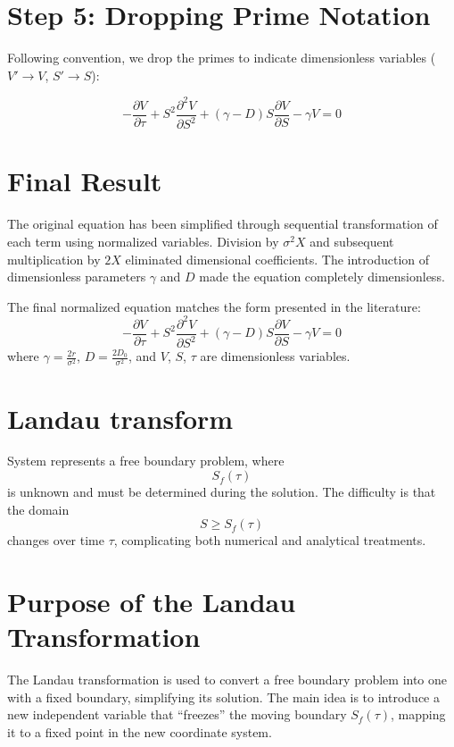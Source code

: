 \documentclass{article}
\begin{document}
\section*{Step 5: Dropping Prime Notation}
Following convention, we drop the primes to indicate dimensionless variables ($V' \to V$, $S' \to S$):

\begin{equation}
-\frac{\partial V}{\partial \tau} + S^2 \frac{\partial^2 V}{\partial S^2} + (\gamma - D) S \frac{\partial V}{\partial S} - \gamma V = 0
\end{equation}

\section*{Final Result}
The original equation has been simplified through sequential transformation of each term using normalized variables. Division by $\sigma^2 X$ and subsequent multiplication by $2X$ eliminated dimensional coefficients. The introduction of dimensionless parameters $\gamma$ and $D$ made the equation completely dimensionless.

The final normalized equation matches the form presented in the literature:
\begin{equation}
-\frac{\partial V}{\partial \tau} + S^2 \frac{\partial^2 V}{\partial S^2} + (\gamma - D) S \frac{\partial V}{\partial S} - \gamma V = 0
\end{equation}
where $\gamma = \frac{2r}{\sigma^2}$, $D = \frac{2D_0}{\sigma^2}$, and $V$, $S$, $\tau$ are dimensionless variables.
\section{Landau transform}
System represents a free boundary problem, where
\[S_f(\tau)\]
is unknown and must be determined during the solution. The difficulty is that the domain
\[S \ge S_f(\tau)\]
changes over time \(\tau\), complicating both numerical and analytical treatments.

\section*{Purpose of the Landau Transformation}
The Landau transformation is used to convert a free boundary problem into one with a fixed boundary, simplifying its solution. The main idea is to introduce a new independent variable that “freezes” the moving boundary \(S_f(\tau)\), mapping it to a fixed point in the new coordinate system.
\end{document}
